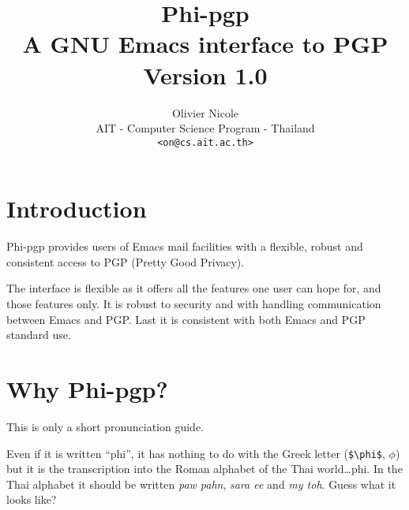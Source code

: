 


\title{Phi-pgp\\A GNU Emacs interface to PGP\\\Large Version 1.0}
\author{Olivier {\sc Nicole}\\AIT - Computer Science Program - Thailand\\\tt <on@cs.ait.ac.th>}
\renewcommand{\today}{August 1994}
\maketitle

\tableofcontents

\section{Introduction}
Phi-pgp provides users of  Emacs  mail facilities with a   flexible,
robust and consistent access to PGP (Pretty Good Privacy). 

The interface is flexible  as it offers  all the features one user can
hope for, and those  features only. It is  robust to security and with
handling communication  between Emacs and PGP.   Last it is consistent
with both Emacs and PGP standard use.

\section{Why Phi-pgp?}

This is only a short pronunciation guide. 

Even if it is written  ``phi'', it has nothing  to  do with the  Greek
letter (\verb+$\phi$+, $\phi$)  but it is  the transcription into  the
Roman alphabet of the  Thai world\ldots phi.  In the Thai  alphabet it
should be  written {\it   paw   pahn}, {\it  sara   ee}  and  {\it  my
toh}. Guess what it looks like?

